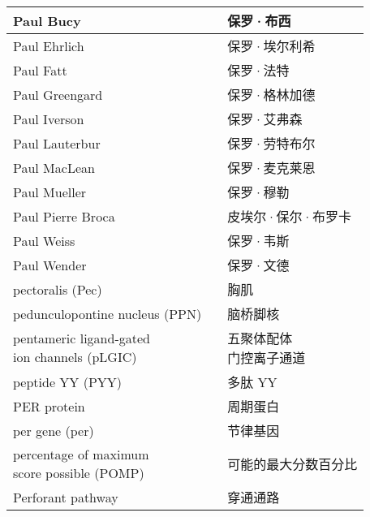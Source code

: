 \begin{longtable}{lll}
	\midrule
	Paul Bucy     && 保罗·布西  \\
	
	\midrule
	Paul Ehrlich     && 保罗·埃尔利希  \\
	
	\midrule
	Paul Fatt     && 保罗·法特  \\
	
	\midrule
	Paul Greengard     && 保罗·格林加德  \\
	
	\midrule
	Paul Iverson     && 保罗·艾弗森  \\
	
	\midrule
	Paul Lauterbur     && 保罗·劳特布尔  \\
	
	\midrule
	Paul MacLean     && 保罗·麦克莱恩  \\
	
	\midrule
	Paul Mueller     && 保罗·穆勒  \\
	
	\midrule
	Paul Pierre Broca     && 皮埃尔·保尔·布罗卡  \\
	
	\midrule
	Paul Weiss     && 保罗·韦斯  \\
	
	\midrule
	Paul Wender     && 保罗·文德  \\
	
	\midrule
	pectoralis (Pec)    && 胸肌   \\
	
	\midrule
	pedunculopontine nucleus (PPN)     && 脑桥脚核   \\
	
	\midrule
	\makecell[l]{pentameric ligand-gated \\ion channels (pLGIC)}     && \makecell[l]{五聚体配体\\门控离子通道}   \\
	
	\midrule
	peptide YY (PYY)     && 多肽 YY   \\
	
	\midrule
	PER protein     && 周期蛋白   \\
	
	\midrule
	per gene (per)     && 节律基因   \\
	
	\midrule
	\makecell[l]{percentage of maximum \\score possible (POMP)}     && 可能的最大分数百分比   \\
	
	\midrule
	Perforant pathway     && 穿通通路   \\
	

\end{longtable}
